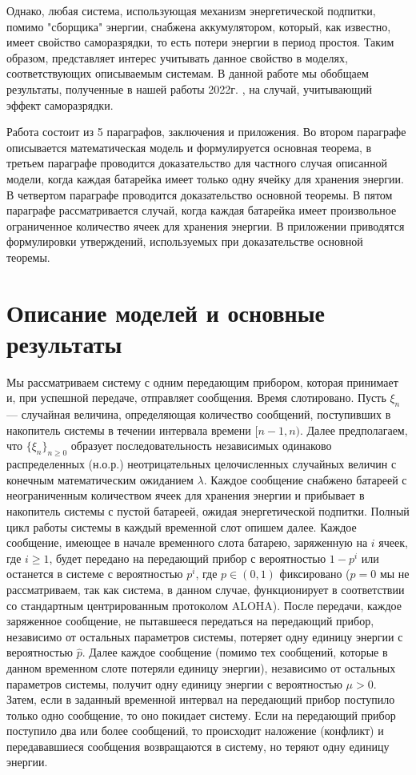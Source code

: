 \documentclass[10pt, reqno]{amsart}
\begin{document}
Однако, любая система, использующая механизм энергетической подпитки, помимо "сборщика"$ $ энергии, снабжена аккумулятором, который, как известно, имеет свойство саморазрядки, то есть потери энергии в период простоя. Таким образом, представляет интерес учитывать данное свойство в моделях, соответствующих описываемым системам. В данной работе мы обобщаем результаты, полученные в нашей работы 2022г. \cite{Rezler_Chebunin}, на случай, учитывающий эффект саморазрядки.

Работа состоит из 5 параграфов, заключения и приложения. Во втором параграфе описывается математическая модель и формулируется основная теорема, в третьем параграфе проводится доказательство для частного случая описанной модели, когда каждая батарейка имеет только одну ячейку для хранения энергии. В четвертом параграфе проводится доказательство основной теоремы. В пятом параграфе рассматривается случай, когда каждая батарейка имеет произвольное ограниченное количество ячеек для хранения энергии. В приложении приводятся формулировки утверждений, используемых при доказательстве основной теоремы.

\section{Описание моделей и основные результаты}
Мы рассматриваем систему с одним передающим прибором, которая принимает и, при успешной передаче, отправляет сообщения. Время слотировано. Пусть $\xi_{n}$ --- случайная величина, определяющая количество сообщений, поступивших в накопитель системы в течении интервала времени $[n-1, n)$. Далее предполагаем, что $\{\xi_{n}\}_{n \geq 0}$ образует последовательность независимых одинаково распределенных (н.о.р.) неотрицательных целочисленных случайных величин с конечным математическим ожиданием $\lambda$. Каждое сообщение снабжено батареей с неограниченным количеством ячеек для хранения энергии и прибывает в накопитель системы с пустой батареей, ожидая энергетической подпитки. Полный цикл работы системы в каждый временной слот опишем далее. Каждое сообщение, имеющее в начале временного слота батарею, заряженную на $i$ ячеек, где $i \geq 1$, будет передано на передающий прибор с вероятностью $1-p^{i}$ или останется в системе с вероятностью $p^{i}$, где $p \in (0, 1)$ фиксировано ($p=0$ мы не рассматриваем, так как система, в данном случае, функционирует в соответствии со стандартным центрированным протоколом ALOHA). После передачи, каждое заряженное сообщение, не пытавшееся передаться на передающий прибор, независимо от остальных параметров системы, потеряет одну единицу энергии с вероятностью $\hat{p}$. Далее каждое сообщение (помимо тех сообщений, которые в данном временном слоте потеряли единицу энергии), независимо от остальных параметров системы, получит одну единицу энергии с вероятностью $\mu > 0$. Затем, если в заданный временной интервал на передающий прибор поступило только одно сообщение, то оно покидает систему. Если на передающий прибор поступило два или более сообщений, то происходит наложение (конфликт) и передававшиеся сообщения возвращаются в систему, но теряют одну единицу энергии.
\end{document}
